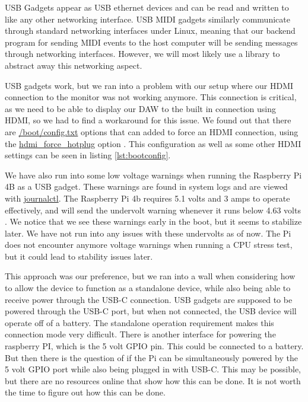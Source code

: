 USB Gadgets appear as USB ethernet devices and can be read and written to like any other
networking interface. USB MIDI gadgets similarly communicate through standard networking
interfaces under Linux, meaning that our backend program for sending MIDI events to the
host computer will be sending messages through networking interfaces. However, we will
most likely use a library to abstract away this networking aspect.

USB gadgets work, but we ran into a problem with our setup where our HDMI connection to
the monitor was not working anymore. This connection is critical, as we need to be able to
display our DAW to the built in connection using HDMI, so we had to find a workaround for
this issue. We found out that there are \url{/boot/config.txt} options that can added to
force an HDMI connection, using the \url{hdmi_force_hotplug} option
\autocite{raspberryPiHDMIFix}. This configuration as well as some other HDMI settings can
be seen in listing \ref{lst:bootconfig}.

We have also run into some low voltage warnings when running the Raspberry Pi 4B as a USB
gadget. These warnings are found in system logs and are viewed with \url{journalctl}. The
Raspberry Pi 4b requires 5.1 volts and 3 amps to operate effectively, and will send the
undervolt warning whenever it runs below 4.63 volts \autocite{raspberryPiAmps}. We notice
that we see these warnings early in the boot, but it seems to stabilize later. We have not
run into any issues with these undervolts as of now. The Pi does not encounter anymore
voltage warnings when running a CPU stress test, but it could lead to stability issues
later.

This approach was our preference, but we ran into a wall when considering how to allow the
device to function as a standalone device, while also being able to receive power through
the USB-C connection. USB gadgets are supposed to be powered through the USB-C port, but
when not connected, the USB device will operate off of a battery. The standalone operation
requirement makes this connection mode very difficult. There is another interface for
powering the raspberry PI, which is the 5 volt GPIO pin. This could be connected to a
battery. But then there is the question of if the Pi can be simultaneously powered by the
5 volt GPIO port while also being plugged in with USB-C. This may be possible, but there
are no resources online that show how this can be done. It is not worth the time to figure
out how this can be done.

